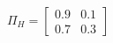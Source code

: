 \documentclass[border=3mm,preview]{standalone}\usepackage{amsmath}
\begin{document}
\[
\Pi_{H}= 
\left[\begin{array}{cc} 
0.9 & 0.1 \\ 
0.7 & 0.3 
\end{array}\right] \] 
\end{document}
